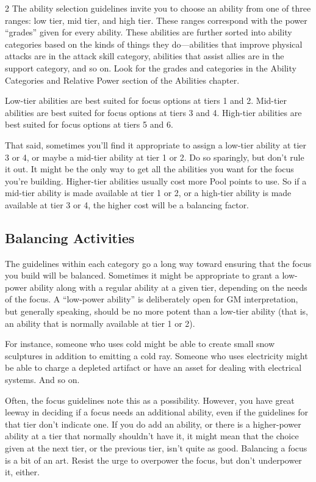 \begin{multicols}{2}
The ability selection guidelines invite you to choose an ability from one of three ranges: low tier, mid tier, and high tier. These ranges correspond with the power “grades” given for every ability. These abilities are further sorted into ability categories based on the kinds of things they do—abilities that improve physical attacks are in the attack skill category, abilities that assist allies are in the support category, and so on. Look for the grades and categories in the Ability Categories and Relative Power section of the Abilities chapter.

Low-tier abilities are best suited for focus options at tiers 1 and 2. Mid-tier abilities are best suited for focus options at tiers 3 and 4. High-tier abilities are best suited for focus options at tiers 5 and 6.

That said, sometimes you’ll find it appropriate to assign a low-tier ability at tier 3 or 4, or maybe a mid-tier ability at tier 1 or 2. Do so sparingly, but don’t rule it out. It might be the only way to get all the abilities you want for the focus you’re building. Higher-tier abilities usually cost more Pool points to use. So if a mid-tier ability is made available at tier 1 or 2, or a high-tier ability is made available at tier 3 or 4, the higher cost will be a balancing factor.

\subsection{Balancing Activities}

The guidelines within each category go a long way toward ensuring that the focus you build will be balanced. Sometimes it might be appropriate to grant a low-power ability along with a regular ability at a given tier, depending on the needs of the focus. A “low-power ability” is deliberately open for GM interpretation, but generally speaking, should be no more potent than a low-tier ability (that is, an ability that is normally available at tier 1 or 2).

For instance, someone who uses cold might be able to create small snow sculptures in addition to emitting a cold ray. Someone who uses electricity might be able to charge a depleted artifact or have an asset for dealing with electrical systems. And so on.

Often, the focus guidelines note this as a possibility. However, you have great leeway in deciding if a focus needs an additional ability, even if the guidelines for that tier don’t indicate one. If you do add an ability, or there is a higher-power ability at a tier that normally shouldn’t have it, it might mean that the choice given at the next tier, or the previous tier, isn’t quite as good. Balancing a focus is a bit of an art. Resist the urge to overpower the focus, but don’t underpower it, either.


\end{multicols}
